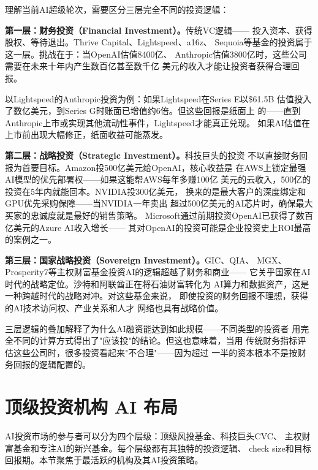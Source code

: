 \begin{corebox}[AI投资的三层逻辑]
理解当前AI超级轮次，需要区分三层完全不同的投资逻辑：

\textbf{第一层：财务投资（Financial Investment）。}传统VC逻辑——
投入资本、获得股权、等待退出。Thrive Capital、Lightspeed、a16z、
Sequoia等基金的投资属于这一层。挑战在于：当OpenAI估值8400亿、
Anthropic估值3800亿时，这些公司需要在未来十年内产生数百亿甚至数千亿
美元的收入才能让投资者获得合理回报。

以Lightspeed的Anthropic投资为例：如果Lightspeed在Series E以\$61.5B
估值投入了数亿美元，到Series G时账面已增值约6倍。但这些回报是纸面上
的——直到Anthropic上市或实现其他流动性事件，Lightspeed才能真正兑现。
如果AI估值在上市前出现大幅修正，纸面收益可能蒸发。

\textbf{第二层：战略投资（Strategic Investment）。}科技巨头的投资
不以直接财务回报为首要目标。Amazon投500亿美元给OpenAI，核心收益是
在AWS上锁定最强AI模型的优先部署权——如果这能帮AWS每年多赚100亿
美元的云收入，500亿的投资在5年内就能回本。NVIDIA投300亿美元，
换来的是最大客户的深度绑定和GPU优先采购保障——当NVIDIA一年卖出
超过500亿美元的AI芯片时，确保最大买家的忠诚度就是最好的销售策略。
Microsoft通过前期投资OpenAI已获得了数百亿美元的Azure AI收入增长——
其对OpenAI的投资可能是企业投资史上ROI最高的案例之一。

\textbf{第三层：国家战略投资（Sovereign Investment）。}GIC、QIA、
MGX、Prosperity7等主权财富基金投资AI的逻辑超越了财务和商业——
它关乎国家在AI时代的战略定位。沙特和阿联酋正在将石油财富转化为
AI算力和数据资产，这是一种跨越时代的战略对冲。对这些基金来说，
即使投资的财务回报不理想，获得的AI技术访问权、产业关系和人才
网络也具有战略价值。

三层逻辑的叠加解释了为什么AI融资能达到如此规模——不同类型的投资者
用完全不同的计算方式得出了"应该投"的结论。但这也意味着，当用
传统财务指标评估这些公司时，很多投资看起来"不合理"——因为超过
一半的资本根本不是按财务回报的逻辑配置的。
\end{corebox}


\section{顶级投资机构 AI 布局}
\label{sec:fund-investors}

AI投资市场的参与者可以分为四个层级：顶级风投基金、科技巨头CVC、
主权财富基金和专注AI的新兴基金。每个层级都有其独特的投资逻辑、
check size和目标回报期。本节聚焦于最活跃的机构及其AI投资策略。

